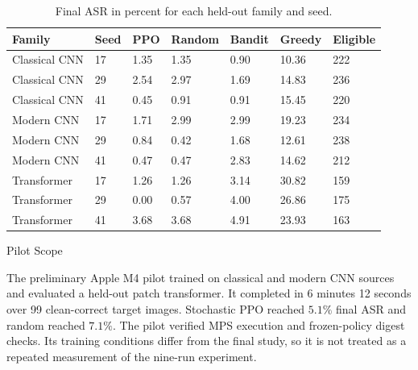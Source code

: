 \documentclass[11pt,a4paper]{article}
\makeatletter
\renewcommand\section{\@startsection{section}{1}{0pt}
  {-2.8ex plus -0.8ex minus -0.2ex}
  {1.3ex plus 0.2ex}
  {\normalfont\large\bfseries\color{researchnavy}}}
\makeatother
\begin{document}
\begin{table}[H]
\centering
\small
\caption{Final ASR in percent for each held-out family and seed.}
\setlength{\tabcolsep}{3.5pt}
\begin{tabularx}{\textwidth}{Y C{0.07\textwidth}C{0.09\textwidth}C{0.09\textwidth}C{0.09\textwidth}C{0.11\textwidth}C{0.08\textwidth}}
\toprule
\textbf{Family} & \textbf{Seed} & \textbf{PPO} & \textbf{Random} & \textbf{Bandit} & \textbf{Greedy} & \textbf{Eligible} \\
\midrule
Classical CNN & 17 & 1.35 & 1.35 & 0.90 & 10.36 & 222 \\
Classical CNN & 29 & 2.54 & 2.97 & 1.69 & 14.83 & 236 \\
Classical CNN & 41 & 0.45 & 0.91 & 0.91 & 15.45 & 220 \\
\addlinespace
Modern CNN & 17 & 1.71 & 2.99 & 2.99 & 19.23 & 234 \\
Modern CNN & 29 & 0.84 & 0.42 & 1.68 & 12.61 & 238 \\
Modern CNN & 41 & 0.47 & 0.47 & 2.83 & 14.62 & 212 \\
\addlinespace
Transformer & 17 & 1.26 & 1.26 & 3.14 & 30.82 & 159 \\
Transformer & 29 & 0.00 & 0.57 & 4.00 & 26.86 & 175 \\
Transformer & 41 & 3.68 & 3.68 & 4.91 & 23.93 & 163 \\
\bottomrule
\end{tabularx}
\end{table}

\section{Pilot Scope}

The preliminary Apple M4 pilot trained on classical and modern CNN sources and evaluated a held-out patch transformer. It completed in 6 minutes 12 seconds over 99 clean-correct target images. Stochastic PPO reached \(5.1\%\) final ASR and random reached \(7.1\%\). The pilot verified MPS execution and frozen-policy digest checks. Its training conditions differ from the final study, so it is not treated as a repeated measurement of the nine-run experiment.
\end{document}
